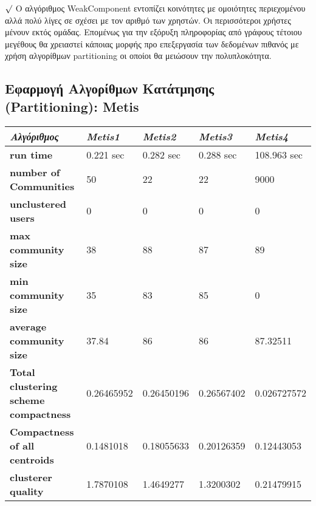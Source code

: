 \noindent
$\surd$ Ο αλγόριθμος WeakComponent εντοπίζει κοινότητες με ομοιότητες περιεχομένου αλλά 
πολύ λίγες σε σχέσει με τον αριθμό των χρηστών. Οι περισσότεροι χρήστες μένουν εκτός 
ομάδας. Επομένως για την εξόρυξη πληροφορίας από γράφους τέτοιου μεγέθους θα χρειαστεί 
κάποιας μορφής προ επεξεργασία των δεδομένων πιθανός με χρήση αλγορίθμων partitioning
οι οποίοι θα μειώσουν την πολυπλοκότητα.

\vspace{3cm}

\clearpage

\subsection{Εφαρμογή Αλγορίθμων Κατάτμησης (Partitioning): Metis}

\vspace{1cm}

\hspace{-6.0em}   
  \begin{tabular}{ | p{4cm} | p{2.5cm} | p{2.5cm} | p{2.5cm} | p{2.5cm} |}
    \hline
    \emph{Αλγόριθμος}				   & \emph{Metis1} 	     & \emph{Metis2}	     & \emph{Metis3} 	   & \emph{Metis4}\\ \hline \hline
    \textbf{run time}			 	   & 0.221 sec 	     	     & 0.282 sec	     & 0.288 sec	   & 108.963 sec 	   \\ \hline  
    \textbf{number of Communities} 	           & 50			     & 22		     & 22		   & 9000	 	   \\ \hline
    \textbf{unclustered users} 	 	   & 0		     	     & 0   		     & 0		   & 0 		   \\ \hline
    \textbf{max community size} 	 	   & 38			     & 88  		     & 87	     	   & 89 	   \\ \hline
    \textbf{min community size} 	 	   & 35			     & 83 	     	     & 85		   & 0		   \\ \hline
    \textbf{average community size}	 	   & 37.84  		     & 86 	     	     & 86	   	   & 87.32511 	   \\ \hline
    \textbf{Total clustering scheme compactness}  & 0.26465952 	     & 0.26450196	     & 0.26567402	   & 0.026727572     \\ \hline
    \textbf{Compactness of all centroids} 	   & 0.1481018  	     & 0.18055633 	     & 0.20126359	   & 0.12443053     \\ \hline
    \textbf{clusterer quality} 		   & 1.7870108	 	     & 1.4649277  	     & 1.3200302	   & 0.21479915     \\ 
    \hline
  \end{tabular}


